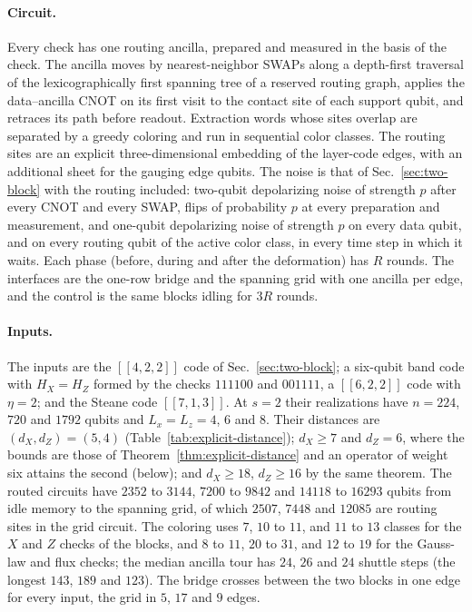 \documentclass[aps,prx,reprint,superscriptaddress,nofootinbib,floatfix,longbibliography]{revtex4-2}
\theoremstyle{definition}
\begin{document}
\paragraph{Circuit.}
Every check has one routing ancilla, prepared and measured in the basis of
the check.  The ancilla moves by nearest-neighbor SWAPs along a depth-first
traversal of the lexicographically first spanning tree of a reserved routing
graph, applies the data--ancilla CNOT on its first visit to the contact site
of each support qubit, and retraces its path before readout.  Extraction
words whose sites overlap are separated by a greedy coloring and run in
sequential color classes.  The routing sites are an explicit
three-dimensional embedding of the layer-code edges, with an additional
sheet for the gauging edge qubits.  The noise is that of
Sec.~\ref{sec:two-block} with the routing included: two-qubit depolarizing
noise of strength $p$ after every CNOT and every SWAP, flips of probability
$p$ at every preparation and measurement, and one-qubit depolarizing noise
of strength $p$ on every data qubit, and on every routing qubit of the active
color class, in every time step in which it waits.  Each phase (before,
during and after the deformation) has $R$ rounds.  The interfaces are the
one-row bridge and the spanning grid with one ancilla per edge, and the
control is the same blocks idling for $3R$ rounds.

\paragraph{Inputs.}
The inputs are the $[[4,2,2]]$ code of Sec.~\ref{sec:two-block}; a six-qubit
band code with $H_X=H_Z$ formed by the checks $111100$ and $001111$, a
$[[6,2,2]]$ code with $\eta=2$; and the Steane code $[[7,1,3]]$.  At $s=2$
their realizations have $n=224$, $720$ and $1792$ qubits and
$L_x=L_z=4$, $6$ and $8$.  Their distances are $(d_X,d_Z)=(5,4)$
(Table~\ref{tab:explicit-distance}); $d_X\ge7$ and $d_Z=6$, where the bounds
are those of Theorem~\ref{thm:explicit-distance} and an operator of weight
six attains the second (below); and $d_X\ge18$, $d_Z\ge16$ by the same
theorem.  The routed circuits have $2352$ to $3144$, $7200$ to $9842$ and
$14118$ to $16293$ qubits from idle memory to the spanning grid, of which
$2507$, $7448$ and $12085$ are routing sites in the grid circuit.  The
coloring uses $7$, $10$ to $11$, and $11$ to $13$ classes for the $X$ and $Z$
checks of the blocks, and $8$ to $11$, $20$ to $31$, and $12$ to $19$ for the
Gauss-law and flux checks; the median ancilla tour has $24$, $26$ and $24$ shuttle steps (the longest $143$,
$189$ and $123$).  The bridge crosses between the two blocks in one edge for
every input, the grid in $5$, $17$ and $9$ edges.
\end{document}
